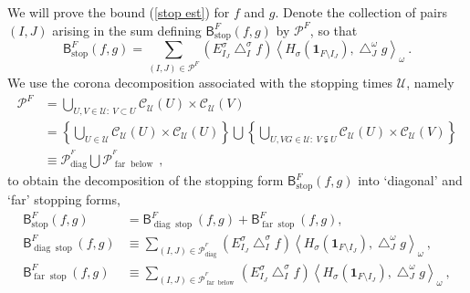\documentclass{amsart}%
\theoremstyle{plain}
\numberwithin{equation}{section}
\begin{document}
We will prove the bound (\ref{stop est}) for $f$ and $g$. Denote the
collection of pairs $\left(  I,J\right)  $ arising in the sum defining
$\mathsf{B}_{\operatorname*{stop}}^{F}\left(  f,g\right)  $ by $\mathcal{P}%
^{F}$, so that%
\[
\mathsf{B}_{\operatorname*{stop}}^{F}\left(  f,g\right)  =\sum_{\left(
I,J\right)  \in\mathcal{P}^{F}}\left(  E_{I_{J}}^{\sigma}\bigtriangleup
_{I}^{\sigma}f\right)  \left\langle H_{\sigma}\left(  \mathbf{1}_{F\setminus
I_{J}}\right)  ,\bigtriangleup_{J}^{\omega}g\right\rangle _{\omega}\ .
\]
We use the corona decomposition associated with the stopping times
$\mathcal{U}$, namely%
\begin{align*}
\mathcal{P}^{F}  & =\bigcup_{U,V\in\mathcal{U}:\ V\subset U}\mathcal{C}%
_{\mathcal{U}}\left(  U\right)  \times\mathcal{C}_{\mathcal{U}}\left(
V\right) \\
& =\left\{  \bigcup_{U\in\mathcal{U}}\mathcal{C}_{\mathcal{U}}\left(
U\right)  \times\mathcal{C}_{\mathcal{U}}\left(  U\right)  \right\}
\bigcup\left\{  \bigcup_{U,VG\in\mathcal{U}:\ V\subsetneqq U}\mathcal{C}%
_{\mathcal{U}}\left(  U\right)  \times\mathcal{C}_{\mathcal{U}}\left(
V\right)  \right\} \\
& \equiv\mathcal{P}_{\operatorname{diag}}^{^{F}}\bigcup\mathcal{P}%
_{\operatorname{far}\operatorname{below}}^{^{F}}\ ,
\end{align*}
to obtain the decomposition of the stopping form $\mathsf{B}%
_{\operatorname*{stop}}^{F}\left(  f,g\right)  $ into `diagonal' and `far'
stopping forms,%
\begin{align*}
\mathsf{B}_{\operatorname*{stop}}^{F}\left(  f,g\right)   & =\mathsf{B}%
_{\operatorname{diag}\operatorname*{stop}}^{F}\left(  f,g\right)
+\mathsf{B}_{\operatorname{far}\operatorname*{stop}}^{F}\left(  f,g\right)
,\\
\mathsf{B}_{\operatorname{diag}\operatorname*{stop}}^{F}\left(  f,g\right)   &
\equiv\sum_{\left(  I,J\right)  \in\mathcal{P}_{\operatorname{diag}}^{^{F}}%
}\left(  E_{I_{J}}^{\sigma}\bigtriangleup_{I}^{\sigma}f\right)  \left\langle
H_{\sigma}\left(  \mathbf{1}_{F\setminus I_{J}}\right)  ,\bigtriangleup
_{J}^{\omega}g\right\rangle _{\omega}\ ,\\
\mathsf{B}_{\operatorname{far}\operatorname*{stop}}^{F}\left(  f,g\right)   &
\equiv\sum_{\left(  I,J\right)  \in\mathcal{P}_{\operatorname{far}%
\operatorname{below}}^{^{F}}}\left(  E_{I_{J}}^{\sigma}\bigtriangleup
_{I}^{\sigma}f\right)  \left\langle H_{\sigma}\left(  \mathbf{1}_{F\setminus
I_{J}}\right)  ,\bigtriangleup_{J}^{\omega}g\right\rangle _{\omega}\ ,
\end{align*}
\end{document}

